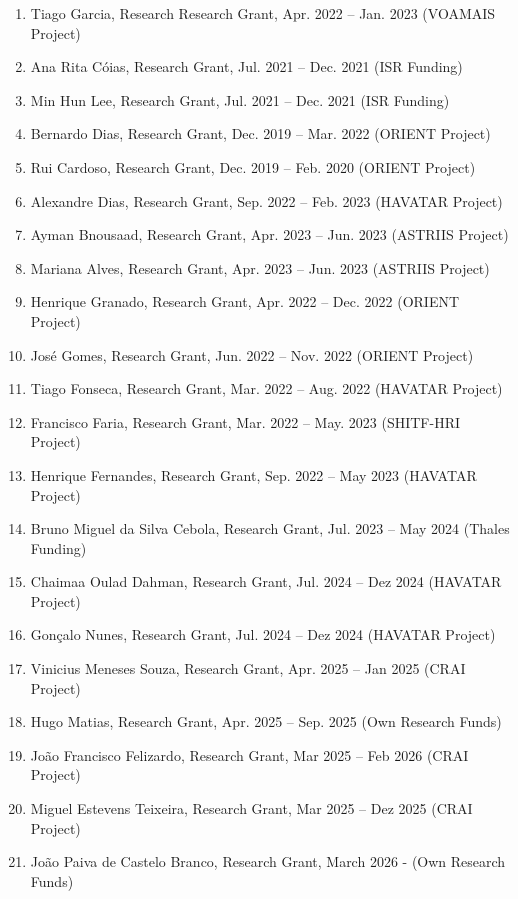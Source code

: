 \documentclass[
]{article}
\begin{document}
\begin{enumerate}
  Tiago Mendes, Research Grant, Apr. 2022 -- Sep. 2022 (VOAMAIS Project)
\item
  Tiago Garcia, Research Research Grant, Apr. 2022 -- Jan. 2023 (VOAMAIS
  Project)
\item
  Ana Rita Cóias, Research Grant, Jul. 2021 -- Dec. 2021 (ISR Funding)
\item
  Min Hun Lee, Research Grant, Jul. 2021 -- Dec. 2021 (ISR Funding)
\item
  Bernardo Dias, Research Grant, Dec. 2019 -- Mar. 2022 (ORIENT Project)
\item
  Rui Cardoso, Research Grant, Dec. 2019 -- Feb. 2020 (ORIENT Project)
\item
  Alexandre Dias, Research Grant, Sep. 2022 -- Feb. 2023 (HAVATAR
  Project)
\item
  Ayman Bnousaad, Research Grant, Apr. 2023 -- Jun. 2023 (ASTRIIS
  Project)
\item
  Mariana Alves, Research Grant, Apr. 2023 -- Jun. 2023 (ASTRIIS
  Project)
\item
  Henrique Granado, Research Grant, Apr. 2022 -- Dec. 2022 (ORIENT
  Project)
\item
  José Gomes, Research Grant, Jun. 2022 -- Nov. 2022 (ORIENT Project)
\item
  Tiago Fonseca, Research Grant, Mar. 2022 -- Aug. 2022 (HAVATAR
  Project)
\item
  Francisco Faria, Research Grant, Mar. 2022 -- May. 2023 (SHITF-HRI
  Project)
\item
  Henrique Fernandes, Research Grant, Sep. 2022 -- May 2023 (HAVATAR
  Project)
\item
  Bruno Miguel da Silva Cebola, Research Grant, Jul. 2023 -- May 2024
  (Thales Funding)
\item
  Chaimaa Oulad Dahman, Research Grant, Jul. 2024 -- Dez 2024 (HAVATAR
  Project)
\item
  Gonçalo Nunes, Research Grant, Jul. 2024 -- Dez 2024 (HAVATAR Project)
\item
  Vinicius Meneses Souza, Research Grant, Apr. 2025 -- Jan 2025 (CRAI
  Project)
\item
  Hugo Matias, Research Grant, Apr. 2025 -- Sep. 2025 (Own Research
  Funds)
\item
  João Francisco Felizardo, Research Grant, Mar 2025 -- Feb 2026 (CRAI
  Project)
\item
  Miguel Estevens Teixeira, Research Grant, Mar 2025 -- Dez 2025 (CRAI
  Project)
\item
  João Paiva de Castelo Branco, Research Grant, March 2026 - (Own
  Research Funds)
\end{enumerate}
\end{document}
